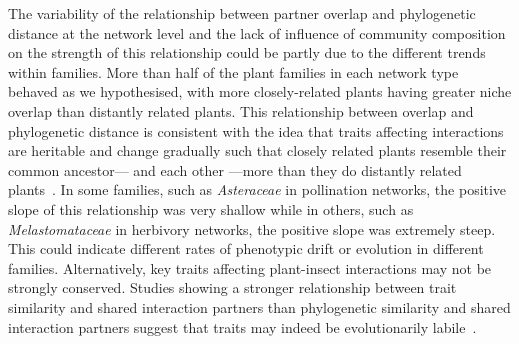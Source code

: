\documentclass[12pt]{article}
\begin{document}
\begin{spacing}{1.5}
  The variability of the relationship between partner overlap and
  phylogenetic distance at the network level and the lack of influence
  of community composition on the strength of this relationship could
  be partly due to the different trends within families. 
  More than half of the plant families in each network type
  behaved as we hypothesised, with more 
  closely-related plants having greater niche overlap than 
  distantly related plants. This relationship between overlap and 
  phylogenetic distance is consistent with the idea that traits affecting 
  interactions are heritable and change gradually
  such that closely related plants resemble their common ancestor--- and
  each other ---more than they do distantly related 
  plants~\citep{Schemske1999,Gilbert2015,Ponisio2017}. In some families, 
  such as \emph{Asteraceae} in pollination networks, the positive slope of 
  this relationship was very shallow while in others, such as 
  \emph{Melastomataceae} in herbivory networks, the positive slope was 
  extremely steep. This could indicate different rates of phenotypic drift 
  or evolution in different families. Alternatively, key traits
  affecting plant-insect interactions may not be strongly
  conserved. Studies showing a stronger relationship between trait similarity
  and shared interaction partners than phylogenetic similarity and shared
  interaction partners suggest that traits may indeed be evolutionarily
  labile~\citep{Junker2015,Ibanez2016,Endara2017}.



\end{spacing}
\end{document}
